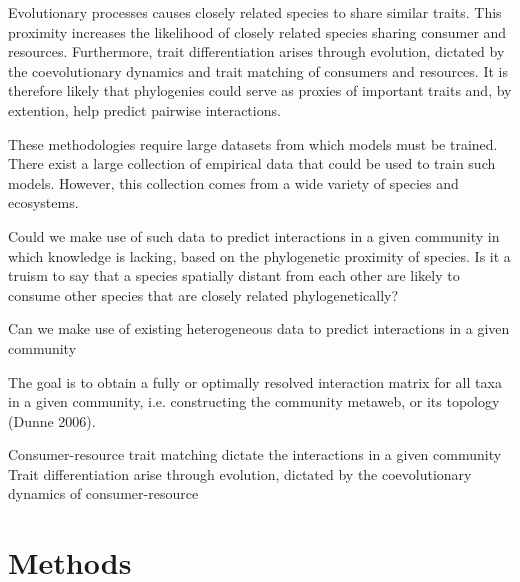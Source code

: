 \documentclass[letterpaper]{article}
\begin{document}
Evolutionary processes causes closely related species to share similar traits. This proximity increases the likelihood of closely related species sharing consumer and resources. Furthermore, trait differentiation arises through evolution, dictated by the coevolutionary dynamics and trait matching of consumers and resources. It is therefore likely that phylogenies could serve as proxies of important traits and, by extention, help predict pairwise interactions.




These methodologies require large datasets from which models must be trained. There exist a large collection of empirical data that could be used to train such models. However, this collection comes from a wide variety of species and ecosystems.

Could we make use of such data to predict interactions in a given community in which knowledge is lacking, based on the phylogenetic proximity of species. Is it a truism to say that a species spatially distant from each other are likely to consume other species that are closely related phylogenetically?




  Can we make use of existing heterogeneous data to predict interactions in a given community %

The goal is to obtain a fully or optimally resolved interaction matrix for all taxa in a given community, i.e. constructing the community metaweb, or its topology (Dunne 2006).



  Consumer-resource trait matching dictate the interactions in a given community
  Trait differentiation arise through evolution, dictated by the coevolutionary dynamics of consumer-resource




\section{Methods}
\end{document}
